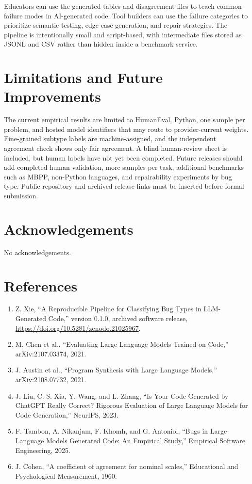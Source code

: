 \documentclass[11pt, letterpaper]{article}
\begin{document}
Educators can use the generated tables and disagreement files to teach common
failure modes in AI-generated code. Tool builders can use the failure categories
to prioritize semantic testing, edge-case generation, and repair strategies. The
pipeline is intentionally small and script-based, with intermediate files stored
as JSONL and CSV rather than hidden inside a benchmark service.

\section*{Limitations and Future Improvements}
The current empirical results are limited to HumanEval, Python, one sample per
problem, and hosted model identifiers that may route to provider-current weights.
Fine-grained subtype labels are machine-assigned, and the independent agreement
check shows only fair agreement. A blind human-review sheet is included, but
human labels have not yet been completed. Future releases should add completed
human validation, more samples per task, additional benchmarks such as MBPP,
non-Python languages, and repairability experiments by bug type. Public repository
and archived-release links must be inserted before formal submission.

\section*{Acknowledgements}
No acknowledgements.

\section*{References}
\begin{enumerate}[leftmargin=*]
  \item Z. Xie, ``A Reproducible Pipeline for Classifying Bug Types in LLM-Generated Code,'' version 0.1.0, archived software release, \url{https://doi.org/10.5281/zenodo.21025967}.
  \item M. Chen et al., ``Evaluating Large Language Models Trained on Code,'' arXiv:2107.03374, 2021.
  \item J. Austin et al., ``Program Synthesis with Large Language Models,'' arXiv:2108.07732, 2021.
  \item J. Liu, C. S. Xia, Y. Wang, and L. Zhang, ``Is Your Code Generated by ChatGPT Really Correct? Rigorous Evaluation of Large Language Models for Code Generation,'' NeurIPS, 2023.
  \item F. Tambon, A. Nikanjam, F. Khomh, and G. Antoniol, ``Bugs in Large Language Models Generated Code: An Empirical Study,'' Empirical Software Engineering, 2025.
  \item J. Cohen, ``A coefficient of agreement for nominal scales,'' Educational and Psychological Measurement, 1960.
\end{enumerate}
\end{document}
